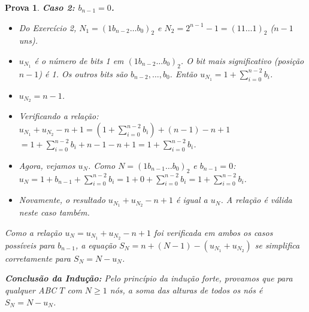 \documentclass[11pt,reqno,a4paper]{amsart}
\theoremstyle{prova_style}
\newtheorem*{prova}{Prova} %
\begin{document}
\begin{prova}
\textbf{Caso 2: $b_{n-1} = 0$.}
\begin{itemize}
    \item Do Exercício 2, $N_1 = (1 b_{n-2} \dots b_0)_2$ e $N_2 = 2^{n-1} - 1 = (11\dots1)_2$ ($n-1$ uns).
    \item $u_{N_1}$ é o número de bits 1 em $(1 b_{n-2} \dots b_0)_2$. O bit mais significativo (posição $n-1$) é 1. Os outros bits são $b_{n-2}, \dots, b_0$. Então $u_{N_1} = 1 + \sum_{i=0}^{n-2} b_i$.
    \item $u_{N_2} = n-1$.
    \item Verificando a relação:
      $u_{N_1} + u_{N_2} - n + 1 = \left(1 + \sum_{i=0}^{n-2} b_i\right) + (n-1) - n + 1$
      $= 1 + \sum_{i=0}^{n-2} b_i + n - 1 - n + 1 = 1 + \sum_{i=0}^{n-2} b_i$.
    \item Agora, vejamos $u_N$. Como $N = (1 b_{n-1} \dots b_0)_2$ e $b_{n-1}=0$:
      $u_N = 1 + b_{n-1} + \sum_{i=0}^{n-2} b_i = 1 + 0 + \sum_{i=0}^{n-2} b_i = 1 + \sum_{i=0}^{n-2} b_i$.
    \item Novamente, o resultado $u_{N_1} + u_{N_2} - n + 1$ é igual a $u_N$. A relação é válida neste caso também.
\end{itemize}

Como a relação $u_N = u_{N_1} + u_{N_2} - n + 1$ foi verificada em ambos os casos possíveis para $b_{n-1}$, a equação $S_N = n + (N - 1) - (u_{N_1} + u_{N_2})$ se simplifica corretamente para $S_N = N - u_N$.

\textbf{Conclusão da Indução:} Pelo princípio da indução forte, provamos que para qualquer ABC $T$ com $N \ge 1$ nós, a soma das alturas de todos os nós é $S_N = N - u_N$.
\end{prova}
\end{document}
